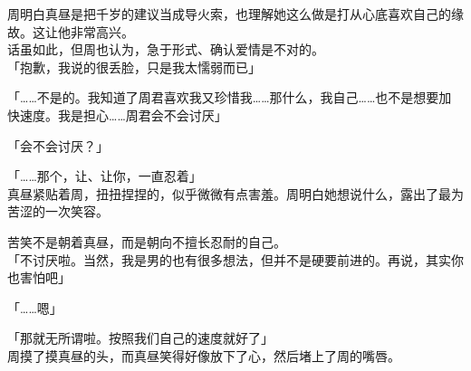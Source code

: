 周明白真昼是把千岁的建议当成导火索，也理解她这么做是打从心底喜欢自己的缘故。这让他非常高兴。\\

话虽如此，但周也认为，急于形式、确认爱情是不对的。\\

「抱歉，我说的很丢脸，只是我太懦弱而已」

「……不是的。我知道了周君喜欢我又珍惜我……那什么，我自己……也不是想要加快速度。我是担心……周君会不会讨厌」

「会不会讨厌？」

「……那个，让、让你，一直忍着」\\

真昼紧贴着周，扭扭捏捏的，似乎微微有点害羞。周明白她想说什么，露出了最为苦涩的一次笑容。

苦笑不是朝着真昼，而是朝向不擅长忍耐的自己。\\

「不讨厌啦。当然，我是男的也有很多想法，但并不是硬要前进的。再说，其实你也害怕吧」

「……嗯」

「那就无所谓啦。按照我们自己的速度就好了」\\

周摸了摸真昼的头，而真昼笑得好像放下了心，然后堵上了周的嘴唇。\\

